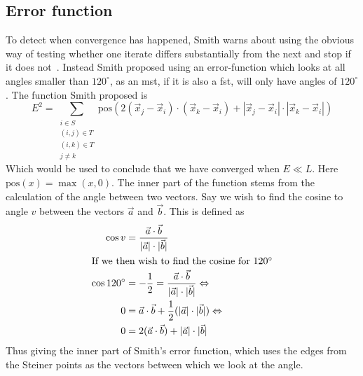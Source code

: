 
\subsection{Error function}
\label{sec:error-function}


To detect when convergence has happened, Smith warns about using the obvious way
of testing whether one iterate differs substantially from the next and stop if
it does not~\cite[p.~151]{Smith1992}.  Instead Smith proposed using an
error-function which looks at all angles smaller than $120^{\circ}$, as an
\gls{mst}, if it is also a \gls{fst}, will only have angles of $120^{\circ}$.
The function Smith proposed is
%
\begin{equation}
  \label{eq:1} E^2 = \sum_{
    \begin{array}{c} i \in S \\ (i,j) \in T \\ (i,k) \in T \\ j \ne k
    \end{array}} \text{pos} (2 (\vec x_j - \vec x_i) \cdot (\vec x_k - \vec x_i)
+ | \vec x_j - \vec x_i | \cdot | \vec x_k - \vec x_i |)
\end{equation}
%
Which would be used to conclude that we have converged when $E \ll L$.  Here
$\text{pos}(x) = \max(x, 0)$.  The inner part of the function stems from the
calculation of the angle between two vectors.  Say we wish to find the cosine to
angle $v$ between the vectors $\vec a$ and $\vec b$.  This is defined as
%
\begin{align}
  \cos v & = \frac{\vec a \cdot \vec b}
    {|\vec a| \cdot |\vec b|} \label{eq:2}                 \\
  \intertext{If we then wish to find the cosine for $120^{\circ}$}
  \cos 120^{\circ}
         & = -\frac{1}{2} = \frac{\vec a \cdot \vec b}
    {|\vec a| \cdot |\vec b|} \Leftrightarrow \label{eq:3} \\
  0      & = \vec a \cdot \vec b + \frac{1}{2}
    (|\vec a| \cdot |\vec b|) \Leftrightarrow \label{eq:4} \\
  0      & = 2 (\vec a \cdot \vec b) + |\vec a| \cdot |\vec b| \label{eq:5}
\end{align}
%
Thus giving the inner part of Smith's error function, which uses the edges from
the Steiner points as the vectors between which we look at the angle.

